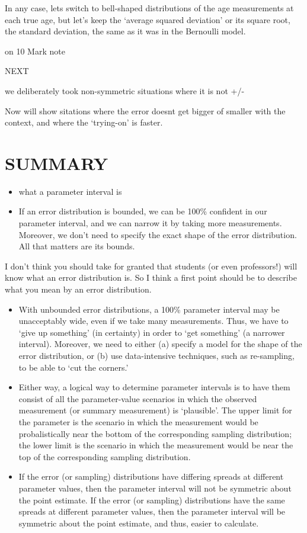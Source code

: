 \documentclass[]{book}
\begin{document}
In any case, lets switch to bell-shaped distributions of the age measurements at each true age, but let's keep the `average squared deviation' or its square root, the standard deviation, the same as it was in the Bernoulli model.

on 10 Mark note

NEXT

we deliberately took non-symmetric situations where it is not +/-

Now will show sitations where the error doesnt get bigger of smaller with the context, and where the `trying-on' is faster.

\hypertarget{summary-1}{%
\section{SUMMARY}\label{summary-1}}

\begin{itemize}
\item
  what a parameter interval is
\item
  If an error distribution is bounded, we can be 100\% confident in our parameter interval, and we can narrow it by taking more measurements. Moreover, we don't need to specify the exact shape of the error distribution. All that matters are its bounds.
\end{itemize}

I don't think you should take for granted that students (or even professors!) will know what an error distribution is. So I think a first point should be to describe what you mean by an error distribution.

\begin{itemize}
\item
  With unbounded error distributions, a 100\% parameter interval may be unacceptably wide, even if we take many measurements. Thus, we have to `give up something' (in certainty) in order to `get something' (a narrower interval). Moreover, we need to either (a) specify a model for the shape of the error distribution, or (b) use data-intensive techniques, such as re-sampling, to be able to `cut the corners.'
\item
  Either way, a logical way to determine parameter intervals is to have them consist of all the parameter-value scenarios in which the observed measurement (or summary measurement) is `plausible'. The upper limit for the parameter is the scenario in which the measurement would be probalistically near the bottom of the corresponding sampling distribution; the lower limit is the scenario in which the measurement would be near the top of the corresponding sampling distribution.
\item
  If the error (or sampling) distributions have differing spreads at different parameter values, then the parameter interval will not be symmetric about the point estimate. If the error (or sampling) distributions have the same spreads at different parameter values, then the parameter interval will be symmetric about the point estimate, and thus, easier to calculate.
\end{itemize}
\end{document}
